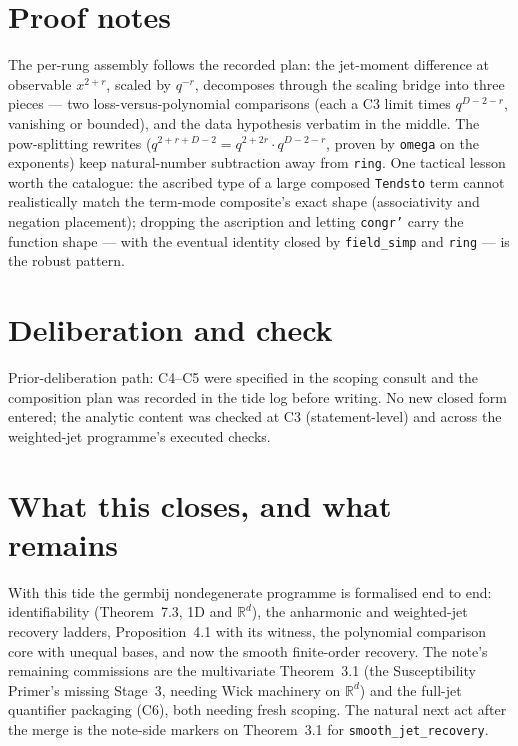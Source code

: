\documentclass[11pt]{article}
\begin{document}
\section{Proof notes}

The per-rung assembly follows the recorded plan: the jet-moment
difference at observable $x^{2+r}$, scaled by $q^{-r}$, decomposes
through the scaling bridge into three pieces --- two
loss-versus-polynomial comparisons (each a C3 limit times
$q^{D-2-r}$, vanishing or bounded), and the data hypothesis verbatim
in the middle. The pow-splitting rewrites
($q^{2+r+D-2} = q^{2+2r} \cdot q^{D-2-r}$, proven by \texttt{omega}
on the exponents) keep natural-number subtraction away from
\texttt{ring}. One tactical lesson worth the catalogue: the ascribed
type of a large composed \texttt{Tendsto} term cannot realistically
match the term-mode composite's exact shape (associativity and
negation placement); dropping the ascription and letting
\texttt{congr'} carry the function shape --- with the eventual
identity closed by \texttt{field\_simp} and \texttt{ring} --- is the
robust pattern.

\section{Deliberation and check}

Prior-deliberation path: C4--C5 were specified in the scoping consult
and the composition plan was recorded in the tide log before writing.
No new closed form entered; the analytic content was checked at C3
(statement-level) and across the weighted-jet programme's executed
checks.

\section{What this closes, and what remains}

With this tide the germbij nondegenerate programme is formalised end
to end: identifiability (Theorem~7.3, 1D and $\mathbb{R}^d$), the
anharmonic and weighted-jet recovery ladders, Proposition~4.1 with
its witness, the polynomial comparison core with unequal bases, and
now the smooth finite-order recovery. The note's remaining
commissions are the multivariate Theorem~3.1 (the Susceptibility
Primer's missing Stage~3, needing Wick machinery on $\mathbb{R}^d$)
and the full-jet quantifier packaging (C6), both needing fresh
scoping. The natural next act after the merge is the note-side
markers on Theorem~3.1 for \texttt{smooth\_jet\_recovery}.
\end{document}
